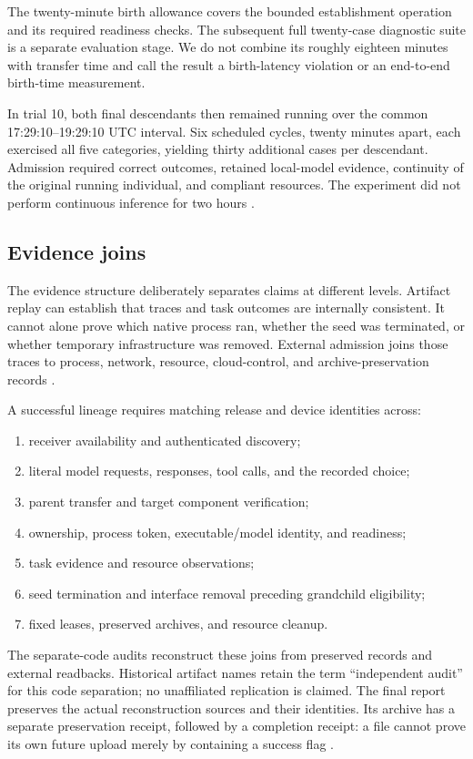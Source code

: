 \documentclass[11pt,letterpaper]{article}
\begin{document}
The twenty-minute birth allowance covers the bounded establishment operation
and its required readiness checks. The subsequent full twenty-case diagnostic
suite is a separate evaluation stage. We do not combine its roughly eighteen
minutes with transfer time and call the result a birth-latency violation or
an end-to-end birth-time measurement.

In trial 10, both final descendants then remained running over the common
17:29:10--19:29:10 UTC interval. Six scheduled cycles, twenty minutes apart,
each exercised all five categories, yielding thirty additional cases per
descendant. Admission required correct outcomes, retained local-model evidence,
continuity of the original running individual, and compliant resources.
The experiment did not perform continuous inference for two hours
\cite{lineages,measurements}.

\subsection{Evidence joins}

The evidence structure deliberately separates claims at different levels.
Artifact replay can establish that traces and task outcomes are internally
consistent. It cannot alone prove which native process ran, whether the seed
was terminated, or whether temporary infrastructure was removed. External
admission joins those traces to process, network, resource, cloud-control, and
archive-preservation records \cite{gates}.

A successful lineage requires matching release and device identities across:
\begin{enumerate}
\item receiver availability and authenticated discovery;
\item literal model requests, responses, tool calls, and the recorded choice;
\item parent transfer and target component verification;
\item ownership, process token, executable/model identity, and readiness;
\item task evidence and resource observations;
\item seed termination and interface removal preceding grandchild eligibility;
\item fixed leases, preserved archives, and resource cleanup.
\end{enumerate}

The separate-code audits reconstruct these joins from preserved records and
external readbacks. Historical artifact names retain the term ``independent
audit'' for this code separation; no unaffiliated replication is claimed.
The final report preserves
the actual reconstruction sources and their identities. Its archive has a
separate preservation receipt, followed by a completion receipt: a file cannot
prove its own future upload merely by containing a success flag
\cite{completion}.
\end{document}
